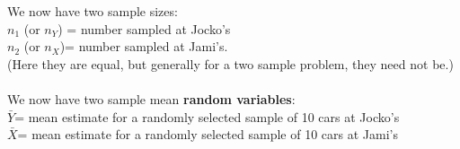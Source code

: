 We now have two sample sizes: \\
$n_1$ (or $n_Y$) = number sampled at Jocko's\\ 
$n_2$ (or $n_X$)= number sampled at Jami's.\\
(Here they are equal, but generally for a two sample problem, they need not be.)\\~\\

We now have two sample mean \textbf{random variables}:\\
$\bar{Y}$= mean estimate for a randomly selected sample of 10 cars at Jocko's\\
$\bar{X}$= mean estimate for a randomly selected sample of 10 cars at Jami's\\~\\

